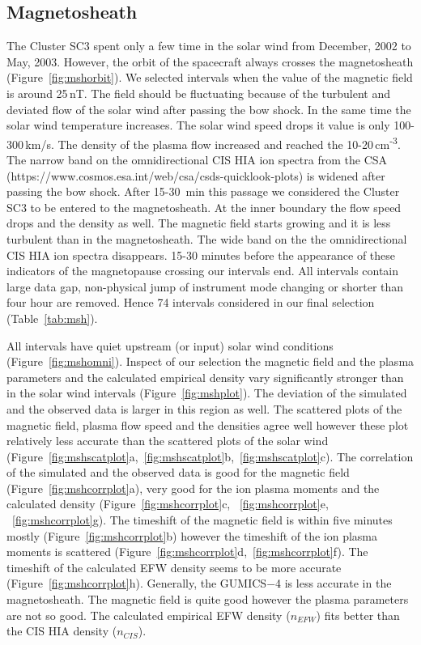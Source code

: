 \documentclass[linenumbers,draft]{agujournal}
\begin{document}
\subsection{Magnetosheath}
\label{sec:msh}

The Cluster SC3 spent only a few time in the solar wind from December, 2002 to May, 2003. However, the orbit of the spacecraft always crosses the magnetosheath (Figure~\ref{fig:mshorbit}). We selected intervals when the value of the magnetic field is around 25\,nT. The field should be fluctuating because of the turbulent and deviated flow of the solar wind after passing the bow shock. In the same time the solar wind temperature increases. The solar wind speed drops it value is only 100-300\,km/s. The density of the plasma flow increased and reached the 10-20\,cm\textsuperscript{-3}.  The narrow band on the  omnidirectional CIS HIA ion spectra from the CSA (https://www.cosmos.esa.int/web/csa/csds-quicklook-plots) is widened after passing the bow shock. After 15-30 \,min this passage we considered the Cluster SC3 to be entered to the magnetosheath. At the inner boundary the flow speed drops and the density as well. The magnetic field starts growing and it is less turbulent than in the magnetosheath. The wide band on the  the omnidirectional CIS HIA ion spectra disappears. 15-30 minutes before the appearance  of these indicators of the magnetopause crossing our intervals end. All intervals contain large data gap, non-physical jump of instrument mode changing or shorter than four hour are removed. Hence 74 intervals considered in our final selection (Table~\ref{tab:msh}). 

All intervals have quiet upstream (or input) solar wind conditions (Figure~\ref{fig:mshomni}). Inspect of our selection the magnetic field and the plasma parameters and the calculated empirical density vary significantly stronger than in the solar wind intervals (Figure~\ref{fig:mshplot}). The deviation of the simulated and the observed data is larger in this region as well. The scattered plots of the magnetic field, plasma flow speed and the densities agree well however these plot relatively less accurate than the scattered plots of the solar wind (Figure~\ref{fig:mshscatplot}a,~\ref{fig:mshscatplot}b,~\ref{fig:mshscatplot}c). The correlation of the simulated and the observed data is good for the magnetic field (Figure~\ref{fig:mshcorrplot}a), very good for the ion plasma moments and the calculated density (Figure~\ref{fig:mshcorrplot}c, ~\ref{fig:mshcorrplot}e, ~\ref{fig:mshcorrplot}g). The timeshift of the magnetic field is within five minutes mostly (Figure~\ref{fig:mshcorrplot}b) however the timeshift of the ion plasma moments is scattered (Figure~\ref{fig:mshcorrplot}d,~\ref{fig:mshcorrplot}f). The timeshift of the calculated EFW density seems to be more accurate (Figure~\ref{fig:mshcorrplot}h). Generally, the GUMICS$-$4 is less accurate in the magnetosheath. The magnetic field is quite good however the plasma parameters are not so good. The calculated empirical EFW density ($n_{EFW}$) fits better than the CIS HIA density ($n_{CIS}$).
\end{document}

